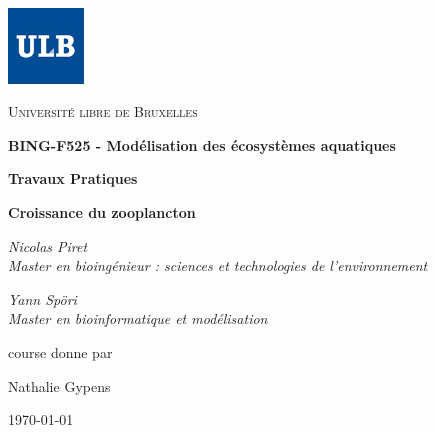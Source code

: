 \documentclass[12pt,a4paper]{article}
\begin{document}
{
\raggedleft
\includegraphics[width=0.15\textwidth]{ulbnorm.jpg}
\par\vspace{-1.8cm}
\centering
{\scshape\LARGE Université libre de Bruxelles \par}
\vspace{2.4cm}
{\Huge\bfseries BING-F525 - Modélisation des écosystèmes aquatiques\par}
\vspace{1.2cm}
{\Large\bfseries Travaux Pratiques\par}
\vspace{1.0cm}
{\LARGE\bfseries Croissance du zooplancton\par}
\vspace{1.5cm}
{\Large\itshape Nicolas Piret\\Master en bioingénieur : sciences et technologies de l'environnement\par}
\vspace{0.5cm}
{\Large\itshape Yann Spöri\\Master en bioinformatique et modélisation\par}
\vfill
course donne par\par
Nathalie Gypens%
\vfill
\begin{center}{\large \today}\end{center}
}
\newpage
{}
\end{document}
